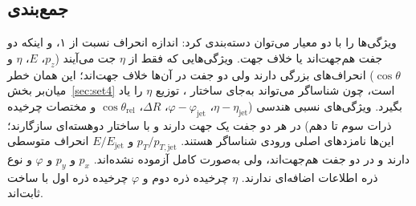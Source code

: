 \subsection{جمع‌بندی}
ویژگی‌ها را با دو معیار می‌توان دسته‌بندی کرد: اندازه انحراف نسبت از ۱، و اینکه دو جفت هم‌جهت‌اند یا خلاف جهت. ویژگی‌هایی که فقط از $\eta$ جت می‌آیند ($p_z$، $E$، $\eta$ و $\cos\theta$) انحراف‌های بزرگی دارند ولی دو جفت در آن‌ها خلاف جهت‌اند؛ این همان خطر میان‌بر بخش~\ref{sec:set4} است، چون شناساگر می‌تواند به‌جای ساختار \Zbos، توزیع $\eta$ را یاد بگیرد. ویژگی‌های نسبی هندسی ($\eta-\eta_\mathrm{jet}$، $\varphi-\varphi_\mathrm{jet}$، $\Delta R$، $\cos\theta_\mathrm{rel}$ و مختصات چرخیده ذرات سوم تا دهم) در هر دو جفت یک جهت دارند و با ساختار دو‌هسته‌ای سازگارند؛ این‌ها نامزدهای اصلی ورودی شناساگر هستند. $p_T/p_{T,\mathrm{jet}}$ و $E/E_\mathrm{jet}$ انحراف متوسطی دارند و در دو جفت هم‌جهت‌اند، ولی به‌صورت کامل آزموده نشده‌اند. $p_x$ و $p_y$ و $\varphi$ و نوع ذره اطلاعات اضافه‌ای ندارند. $\eta$ چرخیده ذره دوم و $\varphi$ چرخیده ذره اول با ساخت ثابت‌اند.

